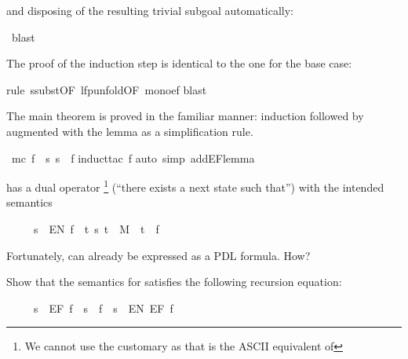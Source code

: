 \begin{isabellebody}
\begin{isamarkuptxt}
\begin{isabelle}
\end{isabelle}
and disposing of the resulting trivial subgoal automatically:%
\end{isamarkuptxt}%
\ blast{\isacharparenright}%
\begin{isamarkuptxt}%
\noindent
The proof of the induction step is identical to the one for the base case:%
\end{isamarkuptxt}%
rule\ ssubst{\isacharbrackleft}OF\ lfp{\isacharunderscore}unfold{\isacharbrackleft}OF\ mono{\isacharunderscore}ef{\isacharbrackright}{\isacharbrackright}{\isacharparenright}\isanewline
{}blast{\isacharparenright}\isanewline
{}%
\begin{isamarkuptext}%
The main theorem is proved in the familiar manner: induction followed by
 augmented with the lemma as a simplification rule.%
\end{isamarkuptext}%
\ {\isachardoublequote}mc\ f\ {\isacharequal}\ {\isacharbraceleft}s{\isachardot}\ s\ {\isasymTurnstile}\ f{\isacharbraceright}{\isachardoublequote}\isanewline
{}induct{\isacharunderscore}tac\ f{\isacharparenright}\isanewline
{}auto\ simp\ add{\isacharcolon}EF{\isacharunderscore}lemma{\isacharparenright}\isanewline
{}%
\begin{isamarkuptext}%
\begin{exercise}
 has a dual operator \footnote{We cannot use the customary 
as that is the ASCII equivalent of \isa{{\isasymexists}}}
(``there exists a next state such that'') with the intended semantics
\begin{isabelle}%
\ \ \ \ \ s\ {\isasymTurnstile}\ EN\ f\ {\isacharequal}\ {\isacharparenleft}{\isasymexists}t{\isachardot}\ {\isacharparenleft}s{\isacharcomma}\ t{\isacharparenright}\ {\isasymin}\ M\ {\isasymand}\ t\ {\isasymTurnstile}\ f{\isacharparenright}%
\end{isabelle}
Fortunately,  can already be expressed as a PDL formula. How?

Show that the semantics for  satisfies the following recursion equation:
\begin{isabelle}%
\ \ \ \ \ s\ {\isasymTurnstile}\ EF\ f\ {\isacharequal}\ {\isacharparenleft}s\ {\isasymTurnstile}\ f\ {\isasymor}\ s\ {\isasymTurnstile}\ EN\ {\isacharparenleft}EF\ f{\isacharparenright}{\isacharparenright}%
\end{isabelle}
\end{exercise}
%
\end{isamarkuptext}%
\end{isabellebody}%
